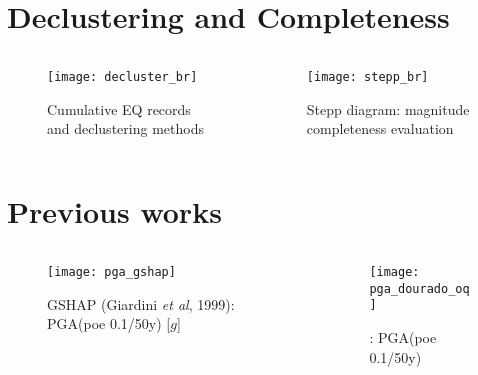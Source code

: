 \documentclass[final]{beamer}
\begin{document}
\begin{poster}
\section{Declustering and Completeness}

\begin{columns}
	\begin{column}[T]{0.49\textwidth}
	\centering
		\begin{figure}[H]
		  	\centering
			\texttt{[image: decluster\_br]}
			\caption{Cumulative EQ records and declustering methods}
			\label{fig:br_eq_record}
		\end{figure}
	\end{column}

	\begin{column}[T]{0.51\textwidth}
		\begin{figure}[H]
		  	\centering
			\texttt{[image: stepp\_br]}
			\caption{Stepp diagram: magnitude completeness evaluation}
			\label{fig:br_stepp}
	    \end{figure}
	\end{column}
\end{columns}



\section{Previous works}

\begin{columns}
	\begin{column}[T]{0.49\textwidth}
	\centering
		\begin{figure}[H]
		  \centering
		  \texttt{[image: pga\_gshap]} 
		  \caption{GSHAP (Giardini \emph{et al}, 1999): PGA(poe 0.1/50y) [$g$]}
		  \label{fig:gshap} 
		\end{figure}
	\end{column}

	\begin{column}[T]{0.49\textwidth}
		\begin{figure}[H]
		  \centering
		  \texttt{[image: pga\_dourado\_oq]} 
		  \caption{\citet{dourado_2014}: PGA(poe 0.1/50y)}
		  \label{fig:pga_dourado_oq} 
		\end{figure}
	\end{column}
\end{columns}



\end{poster}
\end{document}
